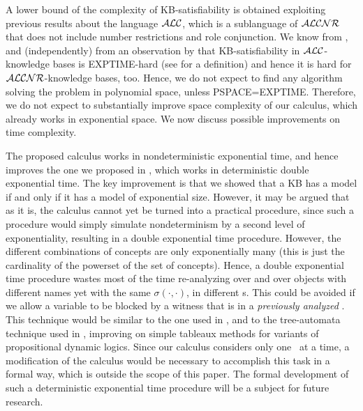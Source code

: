 A lower bound of the complexity of KB-satisfiability is obtained 
exploiting previous results about the language ${\cal ALC}$, which is 
a sublanguage of ${\cal ALCNR}$ that does not include number restrictions and 
role conjunction.
We know from , and (independently) from an observation by
 that KB-satisfiability in ${\cal ALC}$-knowledge bases is
EXPTIME-hard (see \cite[page 183]{GaJo79} for a definition) and hence it is hard
for ${\cal ALCNR}$-knowledge bases, too.  Hence, we do not expect to find any
algorithm solving the problem in polynomial space, unless PSPACE=EXPTIME.
Therefore, we do not expect to substantially improve space complexity of our
calculus, which already works in exponential space. We now discuss possible
improvements on time complexity. 

The proposed calculus works in nondeterministic exponential
time, and hence improves the one we proposed in \cite[Sec.4]{BuDS93b},
which works in deterministic double exponential time. The key improvement is
that we showed that a KB has a model if and only if it has a model of exponential size.
However, it may be argued that as it is, the calculus cannot yet be turned into
a practical procedure, since such a procedure would simply simulate
nondeterminism by a second level of exponentiality, resulting in a double
exponential time procedure. However, the different combinations of concepts are
only exponentially many (this is just the cardinality of the powerset of the set
of concepts). Hence, a double exponential time procedure wastes most of the time
re-analyzing over and over objects with different names yet with the same
$\sigma(\cdot,\cdot)$, in different \cs s. This could be avoided if we allow a
variable to be blocked by a witness that is in a {\em previously analyzed} \cs.
This technique would be similar to the one used in \cite{Prat78}, and to the
tree-automata technique used in \cite{VaWo86}, improving on simple tableaux
methods for variants of propositional dynamic logics. Since our calculus
considers only one \cs\ at a time, a modification of the calculus would be
necessary to accomplish this task in a formal way, which is outside the scope of
this paper. The formal development of such a deterministic
exponential time procedure will be a subject for future research.

